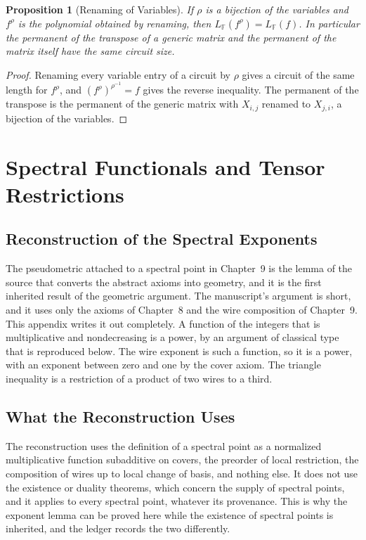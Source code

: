 \documentclass[11pt,letterpaper]{report}
\theoremstyle{plain}
\newtheorem{proposition}[theorem]{Proposition}
\theoremstyle{definition}
\theoremstyle{remark}
\begin{document}
\begin{proposition}[Renaming of Variables]\label{pr:renaming2}
If $\rho$ is a bijection of the variables and $f^\rho$ is the polynomial obtained by renaming, then $L_{\mathbb F}(f^\rho)=L_{\mathbb F}(f)$. In particular the permanent of the transpose of a generic matrix and the permanent of the matrix itself have the same circuit size.
\end{proposition}
\begin{proof}
Renaming every variable entry of a circuit by $\rho$ gives a circuit of the same length for $f^\rho$, and $(f^\rho)^{\rho^{-1}}=f$ gives the reverse inequality. The permanent of the transpose is the permanent of the generic matrix with $X_{i,j}$ renamed to $X_{j,i}$, a bijection of the variables.
\end{proof}

\chapter{Spectral Functionals and Tensor Restrictions}

\section{Reconstruction of the Spectral Exponents}

The pseudometric attached to a spectral point in Chapter~9 is the lemma of the source that converts the abstract axioms into geometry, and it is the first inherited result of the geometric argument. The manuscript's argument is short, and it uses only the axioms of Chapter~8 and the wire composition of Chapter~9. This appendix writes it out completely. A function of the integers that is multiplicative and nondecreasing is a power, by an argument of classical type that is reproduced below. The wire exponent is such a function, so it is a power, with an exponent between zero and one by the cover axiom. The triangle inequality is a restriction of a product of two wires to a third.

\section{What the Reconstruction Uses}

The reconstruction uses the definition of a spectral point as a normalized multiplicative function subadditive on covers, the preorder of local restriction, the composition of wires up to local change of basis, and nothing else. It does not use the existence or duality theorems, which concern the supply of spectral points, and it applies to every spectral point, whatever its provenance. This is why the exponent lemma can be proved here while the existence of spectral points is inherited, and the ledger records the two differently.
\end{document}
